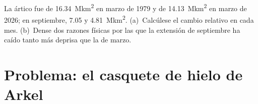 \begin{exercise}[$\star\star\star$]\label{exo:b3:glaciology:12}
La  ártico fue de \qty{16.34}{\mega km^2} en marzo de 1979 y
de \qty{14.13}{\mega km^2} en marzo de 2026; en septiembre, \num{7.05} y
\qty{4.81}{\mega km^2}. (a)~Calcúlese el cambio relativo en cada mes.
(b)~Dense dos razones físicas por las que la extensión de septiembre ha caído tanto
más deprisa que la de marzo.
\end{exercise}

\section{Problema: el casquete de hielo de Arkel}

